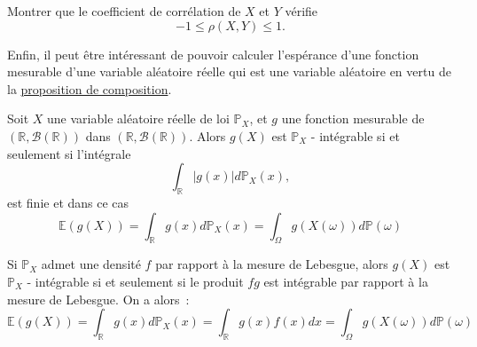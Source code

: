 \label{II-CS-corr}
Montrer que le coefficient de corrélation de \(X\) et \(Y\) vérifie
\[-1\leq \rho(X,Y) \leq 1.\]


Enfin, il peut être intéressant de pouvoir calculer l'espérance d'une
fonction mesurable d'une variable aléatoire réelle qui est une variable
aléatoire en vertu de la
\href{Probabilité\%20I.pdf\%20\#composition}{proposition de
composition}.

\begin{proposition}[{Espérance de
\(g(X)\)}]\label{II-esperanceg}

Soit \(X\) une variable aléatoire réelle de loi \(\mathbb{P}_X\), et
\(g\) une fonction mesurable de \((\mathbb{R},\mathcal{B}(\mathbb{R}))\)
dans \((\mathbb{R},\mathcal{B}(\mathbb{R}))\). Alors \(g(X)\) est
\(\mathbb{P}_X\) - intégrable si et seulement si l'intégrale
\[\int_\mathbb{R}|g(x)| d\mathbb{P}_X(x),\] est finie et dans ce cas
\[\mathbb{E}(g(X)) = \int_\mathbb{R}g(x)d\mathbb{P}_X(x) = \int_\Omega g(X(\omega)) d\mathbb{P}(\omega)\]

Si \(\mathbb{P}_X\) admet une densité \(f\) par rapport à la mesure de
Lebesgue, alors \(g(X)\) est \(\mathbb{P}_X\) - intégrable si et
seulement si le produit \(fg\) est intégrable par rapport à la mesure de
Lebesgue. On a alors~:
\[\mathbb{E}(g(X)) =  \int_\mathbb{R}g(x)d\mathbb{P}_X(x) = \int_\mathbb{R}g(x)f(x)dx = \int_\Omega g(X(\omega)) d\mathbb{P}(\omega)\]
\end{proposition}

